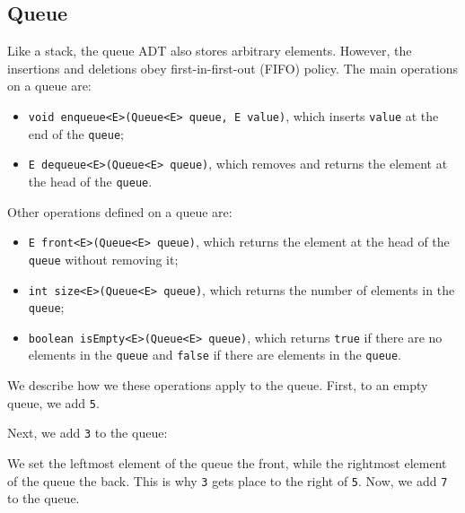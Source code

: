 \documentclass[a4paper, openany]{memoir}
\begin{document}
\subsection{Queue}
Like a stack, the queue ADT also stores arbitrary elements. However, the insertions and deletions obey first-in-first-out (FIFO) policy. The main operations on a queue are:
\begin{itemize}
    \item \texttt{void enqueue<E>(Queue<E> queue, E value)}, which inserts \texttt{value} at the end of the \texttt{queue};
    \item \texttt{E dequeue<E>(Queue<E> queue)}, which removes and returns the element at the head of the \texttt{queue}.
\end{itemize}
Other operations defined on a queue are:
\begin{itemize}
    \item \texttt{E front<E>(Queue<E> queue)}, which returns the element at the head of the \texttt{queue} without removing it;
    \item \texttt{int size<E>(Queue<E> queue)}, which returns the number of elements in the \texttt{queue};
    \item \texttt{boolean isEmpty<E>(Queue<E> queue)}, which returns \texttt{true} if there are no elements in the \texttt{queue} and \texttt{false} if there are elements in the \texttt{queue}.
\end{itemize}
We describe how we these operations apply to the queue. First, to an empty queue, we add \texttt{5}.
\begin{center}
\end{center}
Next, we add \texttt{3} to the queue:
\begin{center}
\end{center}
We set the leftmost element of the queue the front, while the rightmost element of the queue the back. This is why \texttt{3} gets place to the right of \texttt{5}. Now, we add \texttt{7} to the queue.
\end{document}
